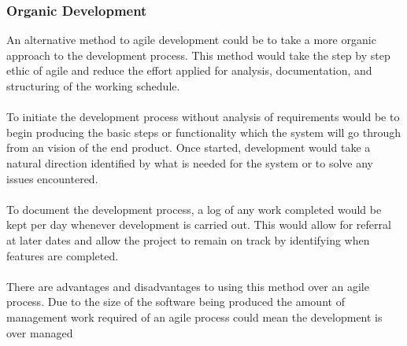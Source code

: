 	\subsubsection{Organic Development}
			An alternative method to agile development could be to take a more organic approach to the development process. This method would take the step by step ethic of agile and reduce the effort applied for analysis, documentation, and structuring of the working schedule.
			\\\\
			To initiate the development process without analysis of requirements would be to begin producing the basic steps or functionality which the system will go through from an vision of the end product. Once started, development would take a natural direction identified by what is needed for the system or to solve any issues encountered.
			\\\\
			To document the development process, a log of any work completed would be kept per day whenever development is carried out. This would allow for referral at later dates and allow the project to remain on track by identifying when features are completed.
			\\\\
			There are advantages and disadvantages to using this method over an agile process. Due to the size of the software being produced the amount of management work required of an agile process could mean the development is over managed
		
